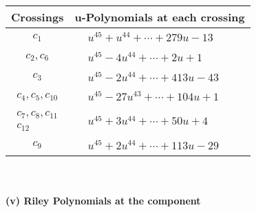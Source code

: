 \documentclass[1p]{elsarticle_modified}
\theoremstyle{definition}
\begin{document}
\begin{tabular}{m{50pt}|m{274pt}}
Crossings & \hspace{64pt}u-Polynomials at each crossing \\
\hline $$\begin{aligned}c_{1}\end{aligned}$$&$\begin{aligned}
&u^{45}+u^{44}+\cdots+279 u-13
\end{aligned}$\\
\hline $$\begin{aligned}c_{2},c_{6}\end{aligned}$$&$\begin{aligned}
&u^{45}-4 u^{44}+\cdots+2 u+1
\end{aligned}$\\
\hline $$\begin{aligned}c_{3}\end{aligned}$$&$\begin{aligned}
&u^{45}-2 u^{44}+\cdots+413 u-43
\end{aligned}$\\
\hline $$\begin{aligned}c_{4},c_{5},c_{10}\end{aligned}$$&$\begin{aligned}
&u^{45}-27 u^{43}+\cdots+104 u+1
\end{aligned}$\\
\hline $$\begin{aligned}c_{7},c_{8},c_{11}\\c_{12}\end{aligned}$$&$\begin{aligned}
&u^{45}+3 u^{44}+\cdots+50 u+4
\end{aligned}$\\
\hline $$\begin{aligned}c_{9}\end{aligned}$$&$\begin{aligned}
&u^{45}+2 u^{44}+\cdots+113 u-29
\end{aligned}$\\
\hline
\end{tabular}\\~\\
\newpage\renewcommand{\arraystretch}{1}
\flushleft \textbf{(v) Riley Polynomials at the component}\newline \\
\end{document}
